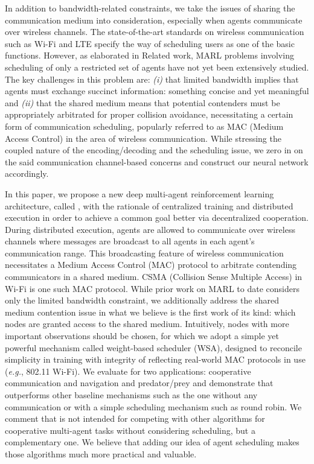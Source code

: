 In addition to bandwidth-related constraints, we take the issues of
sharing the communication medium into consideration, especially when
agents communicate over wireless channels. The state-of-the-art standards on wireless communication such as Wi-Fi and LTE specify the way of scheduling users as one of the basic functions. However, as elaborated in
Related work, MARL problems involving scheduling of only a restricted set
of agents have not yet been extensively studied. The key challenges in
this problem are: {\em (i)} that limited bandwidth implies that agents must
exchange succinct information: something concise and yet meaningful
and {\em (ii)} that the shared medium means that potential contenders must
be appropriately arbitrated for proper collision avoidance,
necessitating a certain form of communication scheduling, popularly 
referred to as MAC (Medium Access Control) in the area of wireless
communication.  While stressing the coupled nature of the
encoding/decoding and the scheduling issue, we zero in on the said
communication channel-based concerns and construct our neural network
accordingly.

 In this paper, we propose a new deep
multi-agent reinforcement learning architecture, called {\sched}, with
the rationale of centralized training and distributed execution in
order to achieve a common goal better via decentralized cooperation.
During distributed execution, agents are allowed to communicate over
wireless channels where messages are broadcast to all agents in each
agent's communication range. This broadcasting feature of wireless
communication necessitates a Medium Access Control (MAC) protocol to
arbitrate contending communicators in a shared medium. CSMA (Collision
Sense Multiple Access)  in Wi-Fi is one such
MAC protocol. While prior work on MARL to date considers only the
limited bandwidth constraint, we additionally address the shared
medium contention issue in what we believe is the first work of its
kind: which nodes are granted access to the shared medium.
Intuitively, nodes with more important observations should be chosen,
for which we adopt a simple yet powerful mechanism called weight-based
scheduler (WSA), designed to reconcile simplicity in training with
integrity of reflecting real-world MAC protocols in use ({\em e.g.},
802.11 Wi-Fi).  We evaluate {\sched} for two applications: cooperative
communication and navigation and predator/prey and demonstrate that
{\sched} outperforms other baseline mechanisms such as the one without
any communication or with a simple scheduling mechanism such as round
robin.  We comment that {\sched} is not intended for competing with
other algorithms for cooperative multi-agent tasks without considering
scheduling, but a complementary one. We believe that adding our idea
of agent scheduling makes those algorithms much more practical and
valuable.


